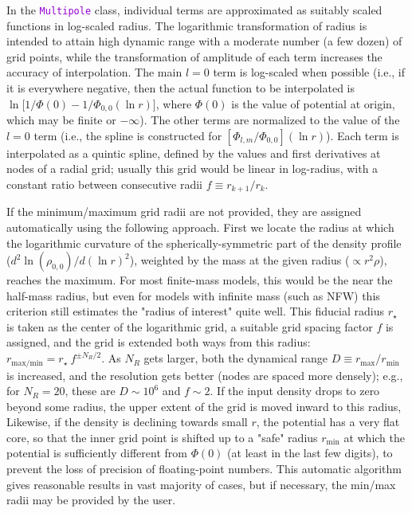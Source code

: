 \documentclass[12pt]{article}
\newcommand{\ttt}[1]{\textcolor{darkviolet}{\texttt{#1}}}
\begin{document}
In the \ttt{Multipole} class, individual terms are approximated as suitably scaled functions in log-scaled radius. The logarithmic transformation of radius is intended to attain high dynamic range with a moderate number (a few dozen) of grid points, while the transformation of amplitude of each term increases the accuracy of interpolation. The main $l=0$ term is log-scaled when possible (i.e., if it is everywhere negative, then the actual function to be interpolated is $\ln\big[1/\Phi(0)-1/\Phi_{0,0}(\ln r)\big]$, where $\Phi(0)$ is the value of potential at origin, which may be finite or $-\infty$). The other terms are normalized to the value of the $l=0$ term (i.e., the spline is constructed for $[\Phi_{l,m}/\Phi_{0,0}](\ln r)$). Each term is interpolated as a quintic spline, defined by the values and first derivatives at nodes of a radial grid; usually this grid would be linear in log-radius, with a constant ratio between consecutive radii $f\equiv r_{k+1}/r_k$.

If the minimum/maximum grid radii are not provided, they are assigned automatically using the following approach. First we locate the radius at which the logarithmic curvature of the spherically-symmetric part of the density profile ($d^2\ln(\rho_{0,0})/d(\ln r)^2$), weighted by the mass at the given radius ($\propto r^2\rho$), reaches the maximum. For most finite-mass models, this would be the near the half-mass radius, but even for models with infinite mass (such as NFW) this criterion still estimates the "radius of interest" quite well. This fiducial radius $r_\star$ is taken as the center of the logarithmic grid, a suitable grid spacing factor $f$ is assigned, and the grid is extended both ways from this radius: $r_\mathrm{max/min} = r_\star\: f^{\pm N_R/2}$. As $N_R$ gets larger, both the dynamical range $D\equiv r_\mathrm{max}/r_\mathrm{min}$ is increased, and the resolution gets better (nodes are spaced more densely); e.g., for $N_R=20$, these are $D\sim 10^6$ and $f\sim 2$. If the input density drops to zero beyond some radius, the upper extent of the grid is moved inward to this radius, Likewise, if the density is declining towards small $r$, the potential has a very flat core, so that the inner grid point is shifted up to a "safe" radius $r_\mathrm{min}$ at which the potential is sufficiently different from $\Phi(0)$ (at least in the last few digits), to prevent the loss of precision of floating-point numbers. This automatic algorithm gives reasonable results in vast majority of cases, but if necessary, the min/max radii may be provided by the user.
\end{document}
